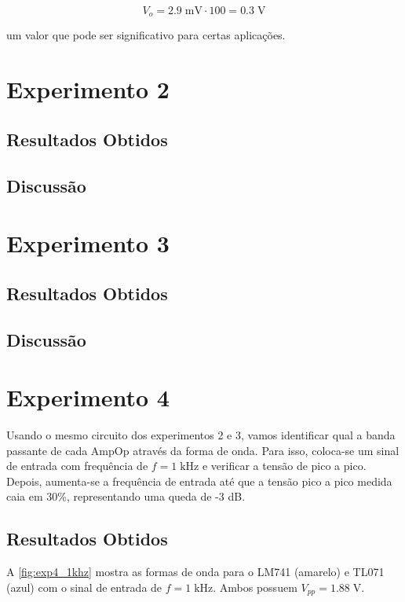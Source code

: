\documentclass[
	12pt,				%
	oneside,			%
	a4paper,			%
	chapter=TITLE,
	sumario=tradicional,
	english,			%
	brazil				%
]{abntex2}
\newcommand{\un}[1]{\;\text{#1}}
\begin{document}
\[ V_o = 2.9 \un{mV} \cdot 100 = 0.3 \un{V} \]

\noindent um valor que pode ser significativo para certas aplicações.

\section{Experimento 2}


\subsection{Resultados Obtidos}


\subsection{Discussão}

\section{Experimento 3}


\subsection{Resultados Obtidos}


\subsection{Discussão}

\section{Experimento 4}

Usando o mesmo circuito dos experimentos 2 e 3, vamos identificar qual a banda passante 
de cada AmpOp através da forma de onda. Para isso, coloca-se um sinal de entrada com 
frequência de $f = 1 \un{kHz}$ e verificar a tensão de pico a pico. Depois, aumenta-se a 
frequência de entrada até que a tensão pico a pico medida caia em 30\%, representando 
uma queda de -3 dB.


\subsection{Resultados Obtidos}

A \autoref{fig:exp4_1khz} mostra as formas de onda para o LM741 (amarelo) e TL071 (azul)
com o sinal de entrada de $f = 1 \un{kHz}$. Ambos possuem $V_{pp} = 1.88 \un{V}$.
\end{document}
